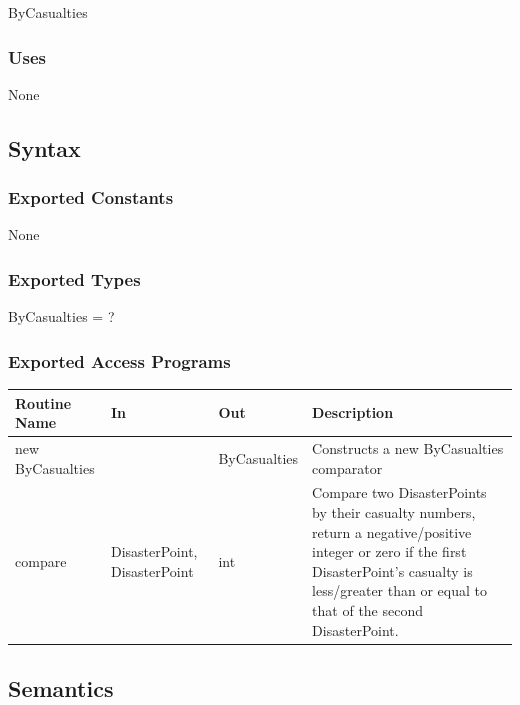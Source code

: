 \documentclass[12pt]{article}
\begin{document}
                ByCasualties
                
                \subsubsection* {Uses}

                None

                \subsection* {Syntax}

                \subsubsection* {Exported Constants}

                None
                
                \subsubsection* {Exported Types}

                ByCasualties = ?

                \subsubsection* {Exported Access Programs}
                
                \begin{tabular}{| l | l | l | p{5cm} |}
                \hline
                \textbf{Routine Name} & \textbf{In} & \textbf{Out} & \textbf{Description}\\
                \hline
                new ByCasualties & & ByCasualties & Constructs a new ByCasualties comparator\\
                \hline
                compare & DisasterPoint, DisasterPoint & int & Compare two DisasterPoints by their casualty numbers, return
                a negative/positive integer or zero if the first DisasterPoint's casualty is less/greater than
                or equal to that of the second DisasterPoint.\\
                \hline
                \end{tabular}
                
                \subsection*{Semantics}
\end{document}
